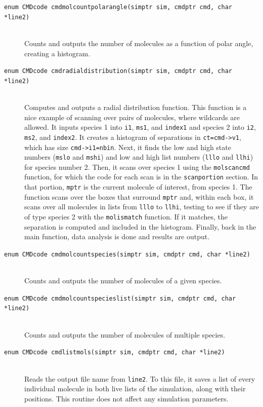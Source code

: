 \documentclass {scrbook}
\newcommand {\ttt} {\texttt}
\begin{document}
\begin{description}
\item[\ttt{enum CMDcode cmdmolcountpolarangle(simptr sim, cmdptr cmd, char *line2)}]
\hfill \\
Counts and outputs the number of molecules as a function of polar angle, creating a histogram.

\item[\ttt{enum CMDcode cmdradialdistribution(simptr sim, cmdptr cmd, char *line2)}]
\hfill \\
Computes and outputs a radial distribution function. This function is a nice example of scanning over pairs of molecules, where wildcards are allowed. It inputs species 1 into \ttt{i1}, \ttt{ms1}, and \ttt{index1} and species 2 into \ttt{i2}, \ttt{ms2}, and \ttt{index2}. It creates a histogram of separations in \ttt{ct=cmd->v1}, which has size \ttt{cmd->i1=nbin}. Next, it finds the low and high state numbers (\ttt{mslo} and \ttt{mshi}) and low and high list numbers (\ttt{lllo} and \ttt{llhi}) for species number 2. Then, it scans over species 1 using the \ttt{molscancmd} function, for which the code for each scan is in the \ttt{scanportion} section. In that portion, \ttt{mptr} is the current molecule of interest, from species 1. The function scans over the boxes that surround \ttt{mptr} and, within each box, it scans over all molecules in lists from \ttt{lllo} to \ttt{llhi}, testing to see if they are of type species 2 with the \ttt{molismatch} function. If it matches, the separation is computed and included in the histogram. Finally, back in the main function, data analysis is done and results are output.

\item[\ttt{enum CMDcode cmdmolcountspecies(simptr sim, cmdptr cmd, char *line2)}]
\hfill \\
Counts and outputs the number of molecules of a given species.

\item[\ttt{enum CMDcode cmdmolcountspecieslist(simptr sim, cmdptr cmd, char *line2)}]
\hfill \\
Counts and outputs the number of molecules of multiple species.

\item[\ttt{enum CMDcode cmdlistmols(simptr sim, cmdptr cmd, char *line2)}]
\hfill \\
Reads the output file name from \ttt{line2}. To this file, it saves a list of every individual molecule in both live lists of the simulation, along with their positions. This routine does not affect any simulation parameters.


\end{description}
\end{document}
